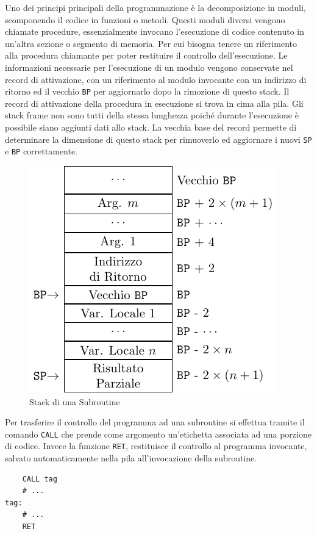 \documentclass{article}
\numberwithin{equation}{subsection}
\begin{document}
Uno dei principi principali della programmazione è la decomposizione in moduli, scomponendo il codice in funzioni o metodi. Questi moduli diversi vengono chiamate procedure, 
essenzialmente invocano l'esecuzione di codice contenuto in un'altra sezione o segmento di memoria. Per cui bisogna tenere un riferimento alla procedura chiamante per 
poter restituire il controllo dell'esecuzione. Le informazioni necessarie per l'esecuzione di un modulo vengono conservate nel record di attivazione, con un riferimento al 
modulo invocante con un indirizzo di ritorno ed il vecchio \verb|BP| per aggiornarlo dopo la rimozione di questo stack. Il record di attivazione della procedura in esecuzione si 
trova in cima alla pila. Gli stack frame non sono tutti della stessa lunghezza poiché durante l'esecuzione è possibile siano aggiunti 
dati allo stack. La vecchia base del record permette di determinare la dimensione di questo stack per rimuoverlo ed aggiornare i nuovi \verb|SP| e \verb|BP| correttamente. 

\begin{figure}[H]%
    \centering%
    \includegraphics{rda-subroutine.pdf}%
    \caption{Stack di una Subroutine}%
\end{figure}

Per trasferire il controllo del programma ad una subroutine si effettua tramite il comando \verb|CALL| che prende come argomento un'etichetta associata ad una porzione di 
codice. 
Invece la funzione \verb|RET|, restituisce il controllo al programma invocante, salvato automaticamente nella pila all'invocazione della subroutine. 
\begin{verbatim}
    CALL tag
    # ...
tag: 
    # ...
    RET
\end{verbatim}
\end{document}
